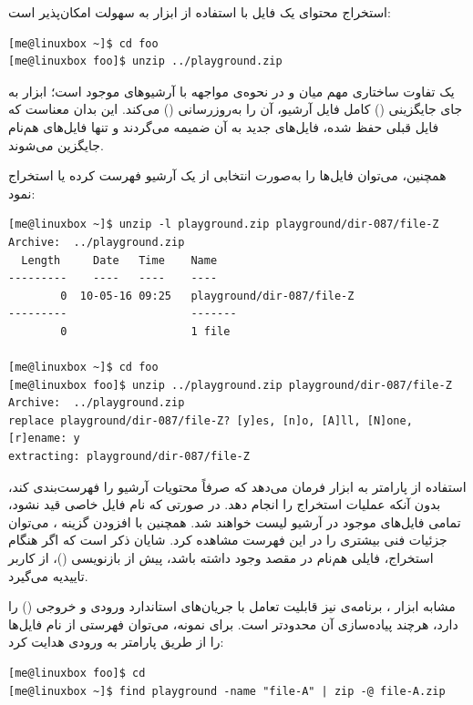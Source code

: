 استخراج محتوای یک فایل  با استفاده از ابزار  به سهولت امکان‌پذیر است:

\begin{latin}
\begin{lstlisting}
[me@linuxbox ~]$ cd foo
[me@linuxbox foo]$ unzip ../playground.zip
\end{lstlisting}
\end{latin}

یک تفاوت ساختاری مهم میان  و  در نحوه‌ی مواجهه با آرشیوهای موجود است؛ ابزار  به جای جایگزینی () کامل فایل آرشیو، آن را به‌روزرسانی () می‌کند. این بدان معناست که فایل قبلی حفظ شده، فایل‌های جدید به آن ضمیمه می‌گردند و تنها فایل‌های هم‌نام جایگزین می‌شوند.

همچنین، می‌توان فایل‌ها را به‌صورت انتخابی از یک آرشیو  فهرست کرده یا استخراج نمود:

\begin{latin}
\begin{lstlisting}
[me@linuxbox ~]$ unzip -l playground.zip playground/dir-087/file-Z
Archive:  ../playground.zip
  Length     Date   Time    Name
---------    ----   ----    ----
        0  10-05-16 09:25   playground/dir-087/file-Z
---------                   -------
        0                   1 file

[me@linuxbox ~]$ cd foo
[me@linuxbox foo]$ unzip ../playground.zip playground/dir-087/file-Z
Archive:  ../playground.zip
replace playground/dir-087/file-Z? [y]es, [n]o, [A]ll, [N]one, [r]ename: y
extracting: playground/dir-087/file-Z
\end{lstlisting}
\end{latin}

استفاده از پارامتر  به ابزار  فرمان می‌دهد که صرفاً محتویات آرشیو را فهرست‌بندی کند، بدون آنکه عملیات استخراج را انجام دهد. در صورتی که نام فایل خاصی قید نشود، تمامی فایل‌های موجود در آرشیو لیست خواهند شد. همچنین با افزودن گزینه ، می‌توان جزئیات فنی بیشتری را در این فهرست مشاهده کرد. شایان ذکر است که اگر هنگام استخراج، فایلی هم‌نام در مقصد وجود داشته باشد،  پیش از بازنویسی ()، از کاربر تاییدیه می‌گیرد.

مشابه ابزار ، برنامه‌ی  نیز قابلیت تعامل با جریان‌های استاندارد ورودی و خروجی () را دارد، هرچند پیاده‌سازی آن محدودتر است. برای نمونه، می‌توان فهرستی از نام فایل‌ها را از طریق پارامتر  به ورودی  هدایت کرد:

\begin{latin}
\begin{lstlisting}
[me@linuxbox foo]$ cd
[me@linuxbox ~]$ find playground -name "file-A" | zip -@ file-A.zip
\end{lstlisting}
\end{latin}

